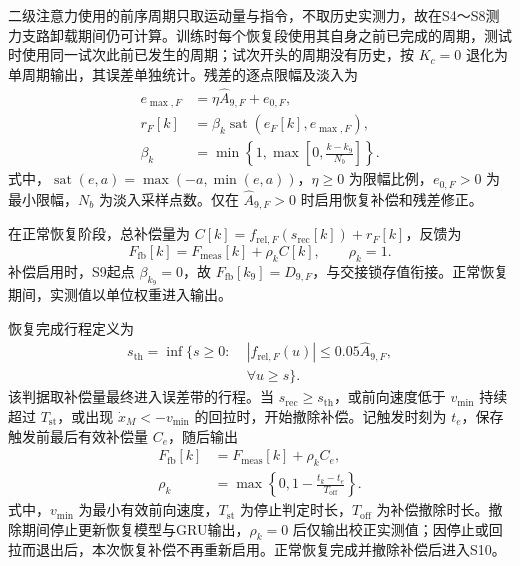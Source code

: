 \documentclass{JQRnew}
\providecommand{\RevisionColor}{\color{black}}
\newcommand{\revbegin}{\begingroup\RevisionColor}
\newcommand{\revend}{\par\endgroup}
\begin{document}
\revbegin
二级注意力使用的前序周期只取运动量与指令，不取历史实测力，故在S4～S8测力支路卸载期间仍可计算。训练时每个恢复段使用其自身之前已完成的周期，测试时使用同一试次此前已发生的周期；试次开头的周期没有历史，按 $K_c=0$ 退化为单周期输出，其误差单独统计。残差的逐点限幅及淡入为
\begin{equation}
\label{eq:residual-limit}
\begin{aligned}
e_{\max,F}&=\eta\widehat A_{9,F}+e_{0,F},\\
r_F[k]&=\beta_k\operatorname{sat}(e_F[k],e_{\max,F}),\\
\beta_k&=\min\!\left\{1,\max\!\left[0,\frac{k-k_9}{N_b}\right]\right\}.
\end{aligned}
\end{equation}
式中，$\operatorname{sat}(e,a)=\max(-a,\min(e,a))$，$\eta\ge0$ 为限幅比例，$e_{0,F}>0$ 为最小限幅，$N_b$ 为淡入采样点数。仅在 $\widehat A_{9,F}>0$ 时启用恢复补偿和残差修正。
\revend

\revbegin
在正常恢复阶段，总补偿量为 $C[k]=f_{\mathrm{rel},F}(s_{\mathrm{rec}}[k])+r_F[k]$，反馈为
\begin{equation}
\label{eq:active-output}
F_{\mathrm{fb}}[k]=F_{\mathrm{meas}}[k]+\rho_kC[k],\qquad \rho_k=1.
\end{equation}
补偿启用时，S9起点 $\beta_{k_9}=0$，故 $F_{\mathrm{fb}}[k_9]=\widehat D_{9,F}$，与交接锁存值衔接。正常恢复期间，实测值以单位权重进入输出。
\revend

\revbegin
恢复完成行程定义为
\begin{equation}
\label{eq:completion-travel}
\begin{aligned}
s_{\mathrm{th}}=\inf\big\{s\ge0:\;&|f_{\mathrm{rel},F}(u)|
\le0.05\widehat A_{9,F},\\
&\forall u\ge s\big\}.
\end{aligned}
\end{equation}
该判据取补偿量最终进入误差带的行程。当 $s_{\mathrm{rec}}\ge s_{\mathrm{th}}$，或前向速度低于 $v_{\min}$ 持续超过 $T_{\mathrm{st}}$，或出现 $\dot x_M<-v_{\min}$ 的回拉时，开始撤除补偿。记触发时刻为 $t_e$，保存触发前最后有效补偿量 $C_e$，随后输出
\begin{equation}
\label{eq:withdrawal}
\begin{aligned}
F_{\mathrm{fb}}[k]&=F_{\mathrm{meas}}[k]+\rho_kC_e,\\
\rho_k&=\max\!\left\{0,1-\frac{t_k-t_e}{T_{\mathrm{off}}}\right\}.
\end{aligned}
\end{equation}
式中，$v_{\min}$ 为最小有效前向速度，$T_{\mathrm{st}}$ 为停止判定时长，$T_{\mathrm{off}}$ 为补偿撤除时长。撤除期间停止更新恢复模型与GRU输出，$\rho_k=0$ 后仅输出校正实测值；因停止或回拉而退出后，本次恢复补偿不再重新启用。正常恢复完成并撤除补偿后进入S10。
\revend
\end{document}
